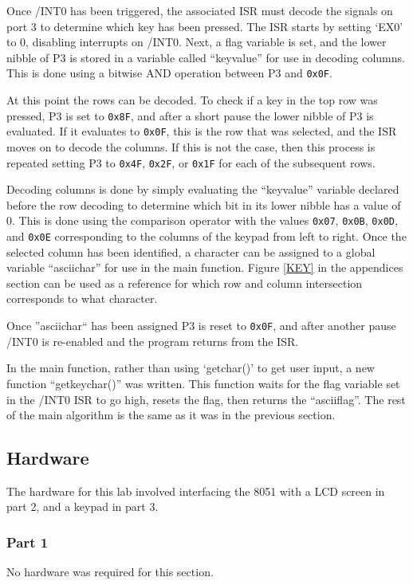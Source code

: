 \documentclass[12pt]{article}
\begin{document}
Once /INT0 has been triggered, the associated ISR must decode the signals on port 3 to determine which key has been pressed. The ISR starts by setting `EX0' to 0, disabling interrupts on /INT0. Next, a flag variable is set, and the lower nibble of P3 is stored in a variable called ``keyvalue'' for use in decoding columns. This is done using a bitwise AND operation between P3 and \texttt{0x0F}.

At this point the rows can be decoded. To check if a key in the top row was pressed, P3 is set to \texttt{0x8F}, and after a short pause the lower nibble of P3 is evaluated. If it evaluates to \texttt{0x0F}, this is the row that was selected, and the ISR moves on to decode the columns. If this is not the case, then this process is repeated setting P3 to \texttt{0x4F}, \texttt{0x2F}, or \texttt{0x1F} for each of the subsequent rows. 

Decoding columns is done by simply evaluating the ``keyvalue'' variable declared before the row decoding to determine which bit in its lower nibble has a value of 0. This is done using the comparison operator with the values \texttt{0x07}, \texttt{0x0B}, \texttt{0x0D}, and \texttt{0x0E} corresponding to the columns of the keypad from left to right. Once the selected column has been identified, a character can be assigned to a global variable ``asciichar'' for use in the main function. Figure \ref{KEY} in the appendices section can be used as a reference for which row and column intersection corresponds to what character. 

Once ''asciichar`` has been assigned P3 is reset to \texttt{0x0F}, and after another pause /INT0 is re-enabled and the program returns from the ISR.  

In the main function, rather than using `getchar()' to get user input, a new function ``getkeychar()'' was written. This function waits for the flag variable set in the /INT0 ISR to go high, resets the flag, then returns the ``asciiflag''. The rest of the main algorithm is the same as it was in the previous section.  

\subsection{Hardware}
The hardware for this lab involved interfacing the 8051 with a LCD screen in part 2, and a keypad in part 3.

\subsubsection{Part 1}
No hardware was required for this section.
\end{document}
